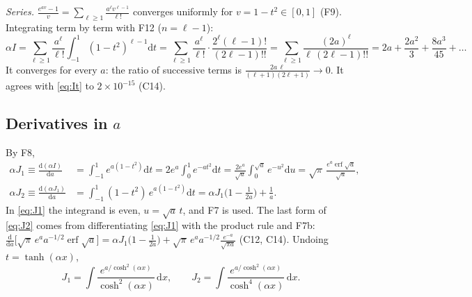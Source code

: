 \documentclass[11pt]{article}
\numberwithin{equation}{section}
\newcommand{\dd}{\mathrm{d}}
\newcommand{\erf}{\operatorname{erf}}
\newcommand{\chk}[1]{{\footnotesize\textsf{(#1)}}}
\begin{document}
\emph{Series.} $\frac{e^{av}-1}{v}=\sum_{\ell\ge1}\frac{a^\ell v^{\ell-1}}{\ell!}$ converges uniformly for $v=1-t^2\in[0,1]$ (F9). Integrating term by term with F12 ($n=\ell-1$):
\begin{equation}
\alpha I=\sum_{\ell\ge1}\frac{a^\ell}{\ell!}\int_{-1}^{1}(1-t^2)^{\ell-1}\dd t=\sum_{\ell\ge1}\frac{a^\ell}{\ell!}\cdot\frac{2^\ell(\ell-1)!}{(2\ell-1)!!}=\sum_{\ell\ge1}\frac{(2a)^\ell}{\ell\,(2\ell-1)!!}=2a+\frac{2a^2}{3}+\frac{8a^3}{45}+\dots
\label{eq:Iseries}
\end{equation}
It converges for every $a$: the ratio of successive terms is $\frac{2a\,\ell}{(\ell+1)(2\ell+1)}\to0$. It agrees with \eqref{eq:It} to $2\times10^{-15}$ \chk{C14}.

\subsection{Derivatives in \texorpdfstring{$a$}{a}}
By F8,
\begin{align}
\alpha J_1\equiv\frac{\dd(\alpha I)}{\dd a}&=\int_{-1}^{1}e^{a(1-t^2)}\dd t=2e^a\int_0^1e^{-at^2}\dd t=\frac{2e^a}{\sqrt a}\int_0^{\sqrt a}e^{-u^2}\dd u=\sqrt\pi\,\frac{e^a\erf\sqrt a}{\sqrt a}, \label{eq:J1}\\
\alpha J_2\equiv\frac{\dd(\alpha J_1)}{\dd a}&=\int_{-1}^{1}(1-t^2)\,e^{a(1-t^2)}\dd t=\alpha J_1\Big(1-\frac{1}{2a}\Big)+\frac1a . \label{eq:J2}
\end{align}
In \eqref{eq:J1} the integrand is even, $u=\sqrt a\,t$, and F7 is used. The last form of \eqref{eq:J2} comes from differentiating \eqref{eq:J1} with the product rule and F7b: $\frac{\dd}{\dd a}\big[\sqrt\pi\,e^aa^{-1/2}\erf\sqrt a\big]=\alpha J_1\big(1-\frac1{2a}\big)+\sqrt\pi\,e^aa^{-1/2}\frac{e^{-a}}{\sqrt{\pi a}}$ \chk{C12, C14}. Undoing $t=\tanh(\alpha x)$,
\begin{equation}
J_1=\int\frac{e^{a/\cosh^2(\alpha x)}}{\cosh^2(\alpha x)}\,\dd x,\qquad J_2=\int\frac{e^{a/\cosh^2(\alpha x)}}{\cosh^4(\alpha x)}\,\dd x .
\label{eq:Jx}
\end{equation}
\end{document}
